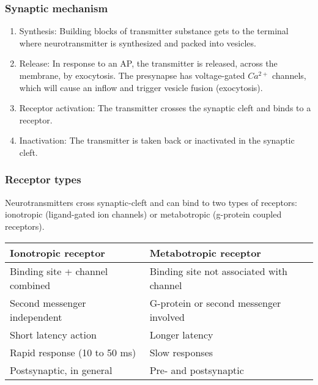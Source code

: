 \documentclass[main]{subfiles}
\begin{document}
\subsubsection{Synaptic mechanism}

\begin{enumerate}
	\item Synthesis: Building blocks of transmitter substance gets to the terminal where neurotransmitter is synthesized and packed into vesicles.
	\item Release: In response to an AP, the transmitter is released, across the membrane, by exocytosis. The presynapse has voltage-gated $Ca^{2+}$ channels, which will cause an inflow and trigger vesicle fusion (exocytosis).
	\item Receptor activation: The transmitter crosses the synaptic cleft and binds to a receptor.
	\item Inactivation: The transmitter is taken back or inactivated in the synaptic cleft.
\end{enumerate}


\subsubsection{Receptor types}
Neurotransmitters cross synaptic-cleft and can bind to two types of receptors: ionotropic (ligand-gated ion channels) or metabotropic (g-protein coupled receptors).

\begin{tabular}{|l|l|}
	\hline
	\textbf{Ionotropic receptor} & \textbf{Metabotropic receptor}\\\hline
	Binding site + channel combined & Binding site not associated with channel\\\hline
	Second messenger independent & G-protein or second messenger involved\\\hline
	Short latency action & Longer latency\\\hline
	Rapid response (10 to 50 ms) & Slow responses\\\hline
	Postsynaptic, in general & Pre- and postsynaptic\\\hline
\end{tabular}
\end{document}
